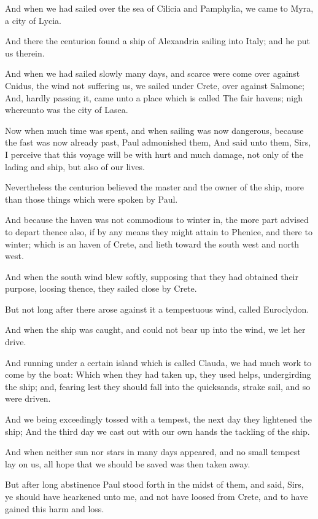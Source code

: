 \verse And when we had sailed over the sea of Cilicia and Pamphylia, we came to Myra, a city of Lycia.

\verse And there the centurion found a ship of Alexandria sailing into Italy; and he put us therein.

\verse And when we had sailed slowly many days, and scarce were come over against Cnidus, the wind not suffering us, we sailed under Crete, over against Salmone; \verse And, hardly passing it, came unto a place which is called The fair havens; nigh whereunto was the city of Lasea.

\verse Now when much time was spent, and when sailing was now dangerous, because the fast was now already past, Paul admonished them, \verse And said unto them, Sirs, I perceive that this voyage will be with hurt and much damage, not only of the lading and ship, but also of our lives.

\verse Nevertheless the centurion believed the master and the owner of the ship, more than those things which were spoken by Paul.

\verse And because the haven was not commodious to winter in, the more part advised to depart thence also, if by any means they might attain to Phenice, and there to winter; which is an haven of Crete, and lieth toward the south west and north west.

\verse And when the south wind blew softly, supposing that they had obtained their purpose, loosing thence, they sailed close by Crete.

\verse But not long after there arose against it a tempestuous wind, called Euroclydon.

\verse And when the ship was caught, and could not bear up into the wind, we let her drive.

\verse And running under a certain island which is called Clauda, we had much work to come by the boat: \verse Which when they had taken up, they used helps, undergirding the ship; and, fearing lest they should fall into the quicksands, strake sail, and so were driven.

\verse And we being exceedingly tossed with a tempest, the next day they lightened the ship; \verse And the third day we cast out with our own hands the tackling of the ship.

\verse And when neither sun nor stars in many days appeared, and no small tempest lay on us, all hope that we should be saved was then taken away.

\verse But after long abstinence Paul stood forth in the midst of them, and said, Sirs, ye should have hearkened unto me, and not have loosed from Crete, and to have gained this harm and loss.

